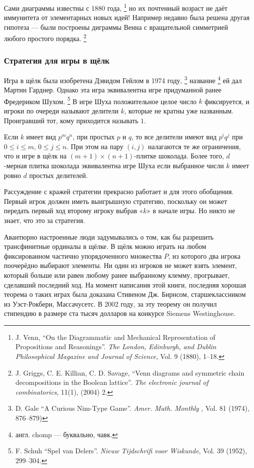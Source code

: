 Сами диаграммы известны с 1880 года,%
\footnote{J. Venn,
``On the Diagrammatic and Mechanical Representation of Propositions and Reasonings''.
\emph{The London, Edinburgh, and Dublin Philosophical Magazine and Journal of Science}, Vol. 9 (1880),  1--18.}
но их почтенный возраст не даёт иммунитета от элементарных новых идей!
Например недавно была решена другая гипотеза --- были построены диграммы Венна с вращательной симметрией любого простого порядка.%
\footnote{J. Griggs, C. E. Killian, C. D. Savage, ``Venn diagrams and symmetric chain decompositions in the Boolean lattice''.
\emph{The electronic journal of combinatorics}, 11(1), (2004)  2.}

\subsubsection*{Стратегия для игры в щёлк}

Игра в щёлк была изобретена Дэвидом Гейлом в 1974 году,%
\footnote{D. Gale ``A Curious Nim-Type Game''. \emph{Amer. Math. Monthly }, Vol. 81 (1974), 876--879)}
 название%
\footnote{англ. chomp --- буквально, чавк.}
 ей дал Мартин Гарднер.
Однако эта игра эквивалентна игре придуманной ранее Фредериком Шухом.%
\footnote{F. Schuh ``Spel van Delers''. \emph{Nieuw Tijdschrifi voor Wiskunde}, Vol. 39 (1952), 299--304.}
В игре Шуха положительное целое число $k$ фиксируется, и игроки по очереди называют делители $k$, которые не кратны уже названным.
Проигравший тот, кому приходится называть $1$.

Если $k$ имеет вид $p^mq^n$, при простых $p$ и $q$, то все делители имеют вид $p^iq^j$ при $0 \le i \le m$, $0 \le j \le n$.
При этом на пару $(i,j)$ налагаются те же ограничения, что и игре в щёлк на $(m+1)\times(n+1)$-плитке шоколада.
Более того, $d$-мерная плитка шоколада эквивалентна игре Шуха если выбранное числи $k$ имеет ровно $d$ простых делителей.

Рассуждение с кражей стратегии прекрасно работает и для этого обобщения.
Первый игрок должен иметь выигрышную стратегию, поскольку он может передать первый ход второму игроку выбрав «$k$» в начале игры.
Но никто не знает, что это за стратегия.

Авантюрно настроенные люди задумывались о том, как бы разрешить трансфинитные ординалы в щёлке.
В щёлк можно играть на любом фиксированном частично упорядоченного множества $P$, из которого два игрока поочерёдно выбирают элементы.
Ни один из игроков не может взять элемент, который больше или равен любому ранее выбранному клемму, прогрывает, сделавший последний ход.
На момент написания этой книги, последняя хорошая теорема о таких играх была доказана Стивеном Дж. Бирнсом, старшеклассником из Уэст-Рокбери, Массачусетс.
В 2002 году, за эту теорему он получил стипендию в размере ста тысяч долларов на конкурсе Siemens Westinghouse.

